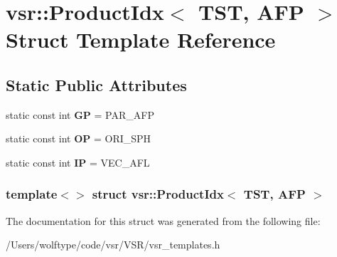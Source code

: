 \hypertarget{structvsr_1_1_product_idx_3_01_t_s_t_00_01_a_f_p_01_4}{\section{vsr\-:\-:Product\-Idx$<$ T\-S\-T, A\-F\-P $>$ Struct Template Reference}
\label{structvsr_1_1_product_idx_3_01_t_s_t_00_01_a_f_p_01_4}
}
\subsection*{Static Public Attributes}
\begin{DoxyCompactItemize}
\item 
\hypertarget{structvsr_1_1_product_idx_3_01_t_s_t_00_01_a_f_p_01_4_a71771663bd4db8910b89fe2d846d7015}{static const int {\bfseries G\-P} = P\-A\-R\-\_\-\-A\-F\-P}\label{structvsr_1_1_product_idx_3_01_t_s_t_00_01_a_f_p_01_4_a71771663bd4db8910b89fe2d846d7015}

\item 
\hypertarget{structvsr_1_1_product_idx_3_01_t_s_t_00_01_a_f_p_01_4_af2ae37d0faa6cedeb771f610ba013d85}{static const int {\bfseries O\-P} = O\-R\-I\-\_\-\-S\-P\-H}\label{structvsr_1_1_product_idx_3_01_t_s_t_00_01_a_f_p_01_4_af2ae37d0faa6cedeb771f610ba013d85}

\item 
\hypertarget{structvsr_1_1_product_idx_3_01_t_s_t_00_01_a_f_p_01_4_a70302a54d032d111a8dd454e8ab98912}{static const int {\bfseries I\-P} = V\-E\-C\-\_\-\-A\-F\-L}\label{structvsr_1_1_product_idx_3_01_t_s_t_00_01_a_f_p_01_4_a70302a54d032d111a8dd454e8ab98912}

\end{DoxyCompactItemize}
\subsubsection*{template$<$$>$ struct vsr\-::\-Product\-Idx$<$ T\-S\-T, A\-F\-P $>$}



The documentation for this struct was generated from the following file\-:\begin{DoxyCompactItemize}
\item 
/\-Users/wolftype/code/vsr/\-V\-S\-R/vsr\-\_\-templates.\-h\end{DoxyCompactItemize}
